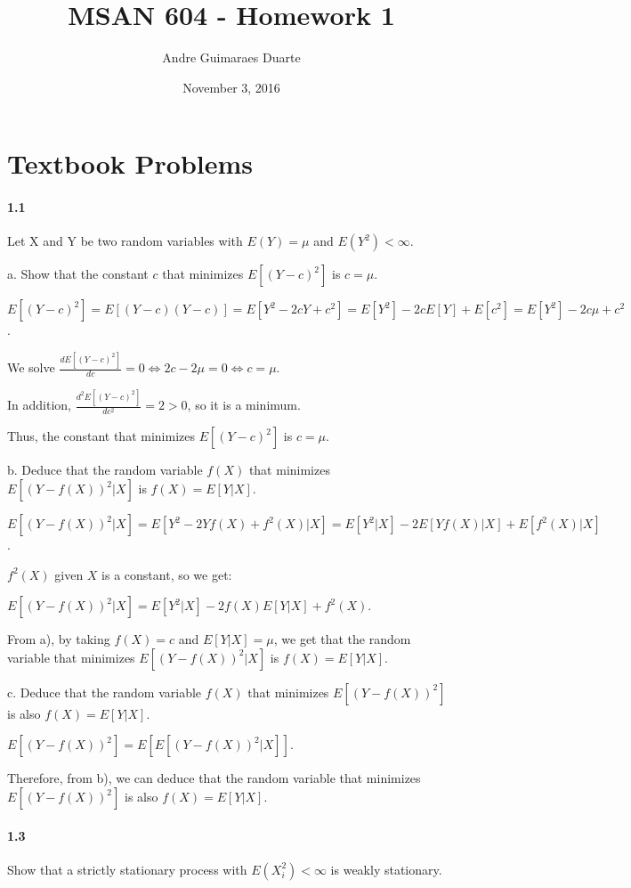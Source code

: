 \documentclass[]{article}
\title{MSAN 604 - Homework 1}
\author{Andre Guimaraes Duarte}
\date{November 3, 2016}
\let\oldparagraph\paragraph
\renewcommand{\paragraph}[1]{\oldparagraph{#1}\mbox{}}
\begin{document}
\maketitle

\section{Textbook Problems}
\paragraph{1.1}
Let X and Y be two random variables with $E(Y) = \mu$ and $E(Y^2) < \infty$.

a. Show that the constant $c$ that minimizes $E[(Y - c)^2]$ is $c = \mu$.

\color{blue}
$E[(Y-c)^2] = E[(Y-c)(Y-c)]
            = E[Y^2 - 2cY + c^2]
            = E[Y^2] - 2cE[Y] + E[c^2]
            = E[Y^2] - 2c\mu + c^2$.

We solve $\frac{d E[(Y-c)^2]}{d c} = 0 \Leftrightarrow 2c - 2\mu = 0 \Leftrightarrow c = \mu$.

In addition, $\frac{d^2 E[(Y-c)^2]}{d c^2} = 2 > 0$, so it is a minimum.

Thus, the constant that minimizes $E[(Y - c)^2]$ is $c = \mu$.
\color{black}

b. Deduce that the random variable $f(X)$ that minimizes $E[(Y - f(X))^2|X]$ is $f(X) = E[Y|X]$.

\color{blue}
$E[(Y - f(X))^2|X] = E[Y^2 - 2Yf(X) + f^2(X)|X]
                   = E[Y^2|X] - 2E[Yf(X)|X] + E[f^2(X)|X]$.

$f^2(X)$ given $X$ is a constant, so we get:

$E[(Y - f(X))^2|X] = E[Y^2|X] - 2f(X)E[Y|X] + f^2(X)$.

From a), by taking $f(X) = c$ and $E[Y|X] = \mu$, we get that the random variable that minimizes $E[(Y - f(X))^2|X]$ is $f(X) = E[Y|X]$.
\color{black}

c. Deduce that the random variable $f(X)$ that minimizes $E[(Y - f(X))^2]$ is also $f(X) = E[Y|X]$.

\color{blue}
$E[(Y - f(X))^2] = E[E[(Y - f(X))^2|X]]$.

Therefore, from b), we can deduce that the random variable that minimizes $E[(Y - f(X))^2]$ is also $f(X) = E[Y|X]$.
\color{black}


\paragraph{1.3}
Show that a strictly stationary process with $E(X_i^2) < \infty$ is weakly stationary.
\end{document}
